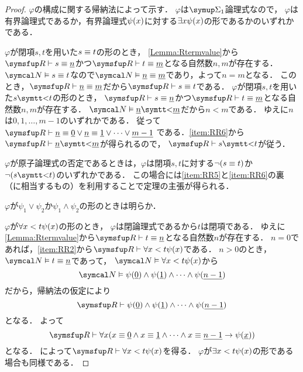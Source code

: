 \begin{proof}
	\(\varphi\)の構成に関する帰納法によって示す．
	\(\varphi\)は\(\SigmaFormula_1\)論理式なので，
	\(\varphi\)は有界論理式であるか，有界論理式\(\apply{\psi}{x}\)に対する\(\exists x \apply{\psi}{x}\)の形であるかのいずれかである．

	\(\varphi\)が閉項\(s, t\)を用いた\(s \equiv t\)の形のとき，
	\cref{Lemma:Rtermvalue}から
	\(\RArithmetic \provable s \objeq \numeral{n}\)かつ\(\RArithmetic \provable t \objeq \numeral{m}\)となる自然数\(n, m\)が存在する．
	\(\standardmodel \satisfy s \objeq t\)なので\(\standardmodel \satisfy \numeral{n} \objeq \numeral{m}\)であり，よって\(n = m\)となる．
	このとき，\(\RArithmetic \provable \numeral{n} \objeq \numeral{m}\)だから\(\RArithmetic \provable s \objeq t\)である．
	\(\varphi\)が閉項\(s, t\)を用いた\(s \obj{<} t\)の形のとき，
	\(\RArithmetic \provable s \objeq \numeral{n}\)かつ\(\RArithmetic \provable t \objeq \numeral{m}\)となる自然数\(n, m\)が存在する．
	\(\standardmodel \satisfy \numeral{n} \obj{<} \numeral{m}\)だから\(n < m\)である．
	ゆえに\(n\)は\(0, 1, \dots, m - 1\)のいずれかである．
	従って\(\RArithmetic \provable \numeral{n} \objeq \numeral{0} \lor \numeral{n} \objeq \numeral{1} \lor \dotsb \lor \numeral{m - 1}\)
	である．\cref{item:RR6}から\(\RArithmetic \provable \numeral{n} \obj{<} \numeral{m}\)が得られるので，
	\(\RArithmetic \provable s \obj{<} t\)が従う．

	\(\varphi\)が原子論理式の否定であるときは，\(\varphi\)は閉項\(s, t\)に対する\(\lnot \paren{s \objeq t}\)か
	\(\lnot \paren{s \obj{<} t}\)のいずれかである．
	この場合には\cref{item:RR5}と\cref{item:RR6}の裏（に相当するもの）を利用することで定理の主張が得られる．

	\(\varphi\)が\(\psi_1 \lor \psi_2\)か\(\psi_1 \land \psi_2\)の形のときは明らか．

	\(\varphi\)が\(\forall x < t \apply{\psi}{x}\)の形のとき，
	\(\varphi\)は閉論理式であるから\(t\)は閉項である．
	ゆえに\cref{Lemma:Rtermvalue}から\(\RArithmetic \provable t \objeq \numeral{n}\)となる自然数\(n\)が存在する．
	\(n = 0\)であれば，\cref{item:RR2}から\(\RArithmetic \provable \forall x < t \apply{\psi}{x}\)である．
	\(n > 0\)のとき，
	\(\standardmodel \satisfy t \objeq \numeral{n}\)であって，
	\(\standardmodel \satisfy \forall x < t \apply{\psi}{x}\)から
	\[
		\standardmodel \satisfy \apply{\psi}{\numeral{0}} \land \apply{\psi}{\numeral{1}} \land \dotsb \land \apply{\psi}{\numeral{n-1}}
	\]
	だから，帰納法の仮定により
	\[
		\RArithmetic \provable \apply{\psi}{\numeral{0}} \land \apply{\psi}{\numeral{1}} \land \dotsb \land \apply{\psi}{\numeral{n-1}}
	\]
	となる．
	よって
	\[
		\RArithmetic \provable \forall x \paren{x \objeq \numeral{0} \land x \objeq \numeral{1} \land \dotsb \land x \objeq \numeral{n-1} \to \apply{\psi}{\numeral{x}}}
	\]
	となる．
	によって\(\RArithmetic \provable \forall x < t \apply{\psi}{x}\)を得る．
	\(\varphi\)が\(\exists x < t \apply{\psi}{x}\)の形である場合も同様である．


\end{proof}
